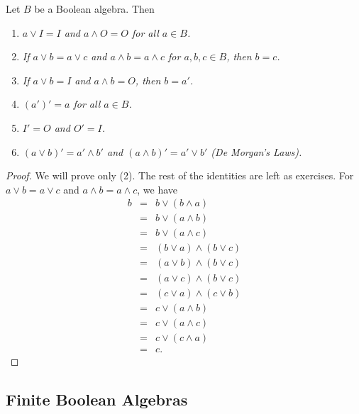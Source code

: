  
\begin{theorem}
Let $B$ be a Boolean algebra. Then
\begin{enumerate}
 
\rm \item \it
$a \vee I = I$ and $a \wedge O = O$ for all $a \in B$. 
 
\rm \item \it
If $a \vee b = a \vee c$ and $a \wedge b = a \wedge c$ for $a, b, c
\in B$, then $b = c$.
 
\rm \item \it
If $a \vee b = I$ and $a \wedge b = O$, then $b = a'$.
 
\rm \item \it
$(a')'=a$ for all $a \in B$.
 
\rm \item \it
$I' = O$ and $O' = I$.
 
\rm \item \it
$(a \vee b)' = a' \wedge b'$ and $(a \wedge b)' = a' \vee b'$ (De
Morgan's Laws).
 
\end{enumerate}
\end{theorem}
 
 
\begin{proof}
We will prove only (2). The rest of the identities are left as
exercises. For $a \vee b = a \vee c$ and $a \wedge b = a \wedge c$, we
have  
\begin{eqnarray*}
b & = & b \vee (b \wedge a)  \\
& = &  b \vee (a \wedge b)  \\
& = &  b \vee (a \wedge c)  \\
& = &  ( b \vee a) \wedge ( b \vee c)  \\
& = &  ( a \vee b) \wedge ( b \vee c)  \\
& = &  ( a \vee c) \wedge ( b \vee c)  \\
& = &  ( c \vee a ) \wedge ( c\vee b )  \\
& = & c \vee (a \wedge b) \\
& = & c \vee ( a \wedge c ) \\
& = & c \vee ( c \wedge a ) \\
& = & c.
\end{eqnarray*}
\end{proof}
 
 
 
\subsection*{Finite Boolean Algebras}
 
